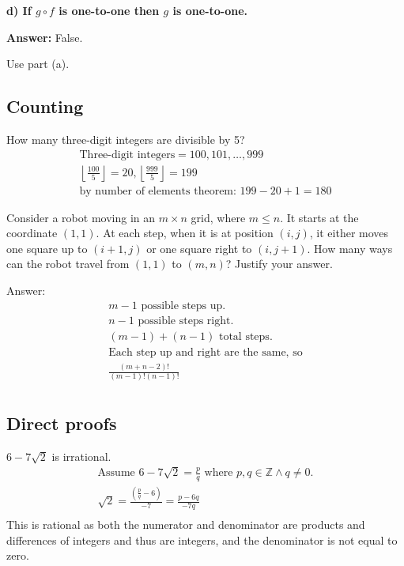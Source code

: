 \documentclass[landscape, letterpaper, 8pt]{extarticle}
\begin{document}
\begin{multicols}{3}
    \textbf{d) If $g \circ f$ is one-to-one then $g$ is one-to-one.}

    \textbf{Answer: } False.

    Use part (a).

    \subsection*{Counting}
    \begin{example}
        How many three-digit integers are divisible by 5?
        \begin{equation*}
            \begin{aligned}
                \text{Three-digit integers} = {100, 101, \ldots, 999}                                         \\
                \left\lfloor \frac{100}{5} \right\rfloor = 20, \left\lfloor \frac{999}{5} \right\rfloor = 199 \\
                \text{by number of elements theorem: } 199-20 + 1 = 180
            \end{aligned}
        \end{equation*}
    \end{example}
    \begin{example}
        Consider a robot moving in an $m \times n$ grid, where $m\leq n$. It starts at the coordinate $(1,1)$. At each step, when it is at position $(i,j)$, it either moves one square up to $(i+1, j)$ or one square right to $(i, j+1)$. How many ways can the robot travel from $(1,1)$ to $(m,n)$? Justify your answer.

        Answer:
        \begin{align*}
            m - 1 \text{ possible steps up.}               \\
            n - 1 \text{ possible steps right.}            \\
            (m - 1) + (n - 1) \text{ total steps.}         \\
            \text{Each step up and right are the same, so} \\
            \frac{(m+n - 2)!}{(m-1)!(n-1)!}                \\
        \end{align*}
    \end{example}
    \subsection*{Direct proofs}
    \begin{example}
        $6-7\sqrt{2}$ is irrational.
        \begin{align*}
            \text{Assume } 6-7\sqrt{2} = \frac{p}{q} \text{ where } p, q \in \mathbb{Z} \land q \not = 0. \\
            \sqrt{2} = \frac{\left(\frac{p}{q}-6\right)}{-7} = \frac{p-6q}{-7q}                           \\
        \end{align*}
        This is rational as both the numerator and denominator are products and differences of integers and thus are integers, and the denominator is not equal to zero.
    \end{example}

\end{multicols}
\end{document}

